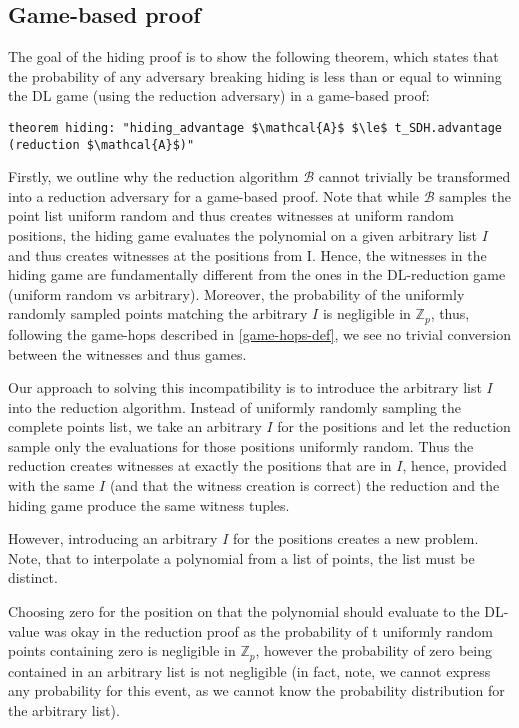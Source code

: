 \subsection*{Game-based proof}
\label{security:hiding:game_based_transf}
The goal of the hiding proof is to show the following theorem, which states that the probability of any adversary breaking hiding is less than or equal to winning the DL game (using the reduction adversary) in a game-based proof:
\begin{lstlisting}[language=isabelle]
    theorem hiding: "hiding_advantage $\mathcal{A}$ $\le$ t_SDH.advantage (reduction $\mathcal{A}$)"
\end{lstlisting}

Firstly, we outline why the reduction algorithm $\mathcal{B}$ cannot trivially be transformed into a reduction adversary for a game-based proof. Note that while $\mathcal{B}$ samples the point list uniform random and thus creates witnesses at uniform random positions, the hiding game evaluates the polynomial on a given arbitrary list $I$ and thus creates witnesses at the positions from I. Hence, the witnesses in the hiding game are fundamentally different from the ones in the DL-reduction game (uniform random vs arbitrary). Moreover, the probability of the uniformly randomly sampled points matching the arbitrary $I$ is negligible in $\mathbb{Z}_p$, thus, following the game-hops described in \ref{game-hops-def}, we see no trivial conversion between the witnesses and thus games.

Our approach to solving this incompatibility is to introduce the arbitrary list $I$ into the reduction algorithm. Instead of uniformly randomly sampling the complete points list, we take an arbitrary $I$ for the positions and let the reduction sample only the evaluations for those positions uniformly random. Thus the reduction creates witnesses at exactly the positions that are in $I$, hence, provided with the same $I$  (and that the witness creation is correct) the reduction and the hiding game produce the same witness tuples.

However, introducing an arbitrary $I$ for the positions creates a new problem. Note, that to interpolate a polynomial from a list of points, the list must be distinct. 

Choosing zero for the position on that the polynomial should evaluate to the DL-value was okay in the reduction proof as the probability of t uniformly random points containing zero is negligible in $\mathbb{Z}_p$, however the probability of zero being contained in an arbitrary list is not negligible (in fact, note, we cannot express any probability for this event, as we cannot know the probability distribution for the arbitrary list).

